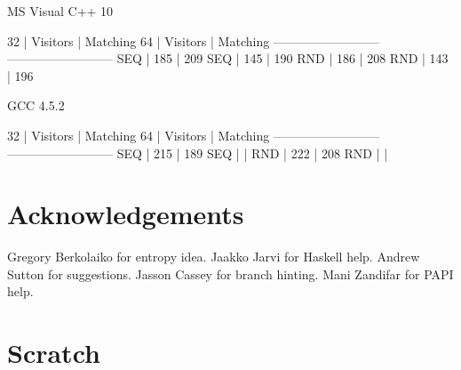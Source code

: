 \documentclass[preprint]{sigplanconf}
\begin{document}
MS Visual C++ 10

 32 | Visitors | Matching      64 | Visitors | Matching 
--------------------------    --------------------------
SEQ |   185    |   209        SEQ |   145    |   190    
RND |   186    |   208        RND |   143    |   196    

GCC 4.5.2

 32 | Visitors | Matching      64 | Visitors | Matching 
--------------------------    --------------------------
SEQ |   215    |   189        SEQ |          |          
RND |   222    |   208        RND |          |          

\section{Acknowledgements} %

Gregory Berkolaiko for entropy idea. Jaakko Jarvi for Haskell help. Andrew Sutton 
for suggestions. Jasson Cassey for branch hinting. Mani Zandifar for PAPI help.

\section{Scratch}
\end{document}
